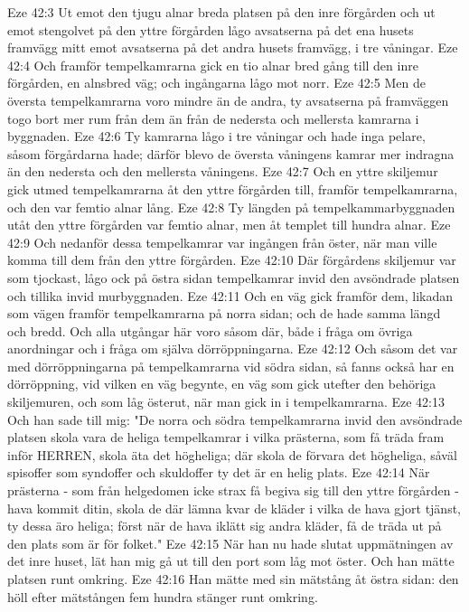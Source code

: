Eze 42:3  Ut emot den tjugu alnar breda platsen på den inre förgården och ut emot stengolvet på den yttre förgården lågo avsatserna på det ena husets framvägg mitt emot avsatserna på det andra husets framvägg, i tre våningar.
Eze 42:4  Och framför tempelkamrarna gick en tio alnar bred gång till den inre förgården, en alnsbred väg; och ingångarna lågo mot norr.
Eze 42:5  Men de översta tempelkamrarna voro mindre än de andra, ty avsatserna på framväggen togo bort mer rum från dem än från de nedersta och mellersta kamrarna i byggnaden.
Eze 42:6  Ty kamrarna lågo i tre våningar och hade inga pelare, såsom förgårdarna hade; därför blevo de översta våningens kamrar mer indragna än den nedersta och den mellersta våningens.
Eze 42:7  Och en yttre skiljemur gick utmed tempelkamrarna åt den yttre förgården till, framför tempelkamrarna, och den var femtio alnar lång.
Eze 42:8  Ty längden på tempelkammarbyggnaden utåt den yttre förgården var femtio alnar, men åt templet till hundra alnar.
Eze 42:9  Och nedanför dessa tempelkamrar var ingången från öster, när man ville komma till dem från den yttre förgården.
Eze 42:10  Där förgårdens skiljemur var som tjockast, lågo ock på östra sidan tempelkamrar invid den avsöndrade platsen och tillika invid murbyggnaden.
Eze 42:11  Och en väg gick framför dem, likadan som vägen framför tempelkamrarna på norra sidan; och de hade samma längd och bredd. Och alla utgångar här voro såsom där, både i fråga om övriga anordningar och i fråga om själva dörröppningarna.
Eze 42:12  Och såsom det var med dörröppningarna på tempelkamrarna vid södra sidan, så fanns också har en dörröppning, vid vilken en väg begynte, en väg som gick utefter den behöriga skiljemuren, och som låg österut, när man gick in i tempelkamrarna.
Eze 42:13  Och han sade till mig: "De norra och södra tempelkamrarna invid den avsöndrade platsen skola vara de heliga tempelkamrar i vilka prästerna, som få träda fram inför HERREN, skola äta det högheliga; där skola de förvara det högheliga, såväl spisoffer som syndoffer och skuldoffer ty det är en helig plats.
Eze 42:14  När prästerna - som från helgedomen icke strax få begiva sig till den yttre förgården - hava kommit ditin, skola de där lämna kvar de kläder i vilka de hava gjort tjänst, ty dessa äro heliga; först när de hava iklätt sig andra kläder, få de träda ut på den plats som är för folket."
Eze 42:15  När han nu hade slutat uppmätningen av det inre huset, lät han mig gå ut till den port som låg mot öster. Och han mätte platsen runt omkring.
Eze 42:16  Han mätte med sin mätstång åt östra sidan: den höll efter mätstången fem hundra stänger runt omkring.

